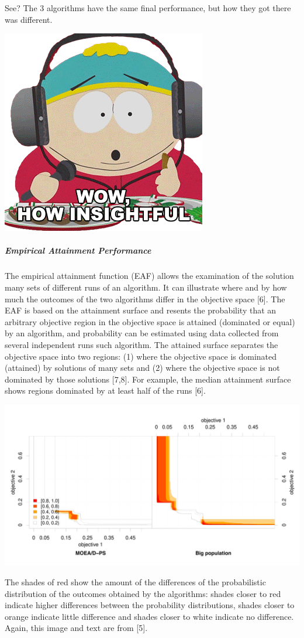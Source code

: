 \documentclass[
]{article}
\begin{document}
See? The 3 algorithms have the same final performance, but how they got
there was different.

\includegraphics[width=0.4\linewidth]{gifs/insightful}

\hypertarget{empirical-attainment-performance}{%
\subparagraph{Empirical Attainment
Performance}\label{empirical-attainment-performance}}

The empirical attainment function (EAF) allows the examination of the
solution many sets of different runs of an algorithm. It can illustrate
where and by how much the outcomes of the two algorithms differ in the
objective space {[}6{]}. The EAF is based on the attainment surface and
resents the probability that an arbitrary objective region in the
objective space is attained (dominated or equal) by an algorithm, and
probability can be estimated using data collected from several
independent runs such algorithm. The attained surface separates the
objective space into two regions: (1) where the objective space is
dominated (attained) by solutions of many sets and (2) where the
objective space is not dominated by those solutions {[}7,8{]}. For
example, the median attainment surface shows regions dominated by at
least half of the runs {[}6{]}.

\includegraphics[width=0.65\linewidth]{imgs/eaf_UF6_big_vs_ps}

The shades of red show the amount of the differences of the
probabilistic distribution of the outcomes obtained by the algorithms:
shades closer to red indicate higher differences between the probability
distributions, shades closer to orange indicate little difference and
shades closer to white indicate no difference. Again, this image and
text are from {[}5{]}.
\end{document}
